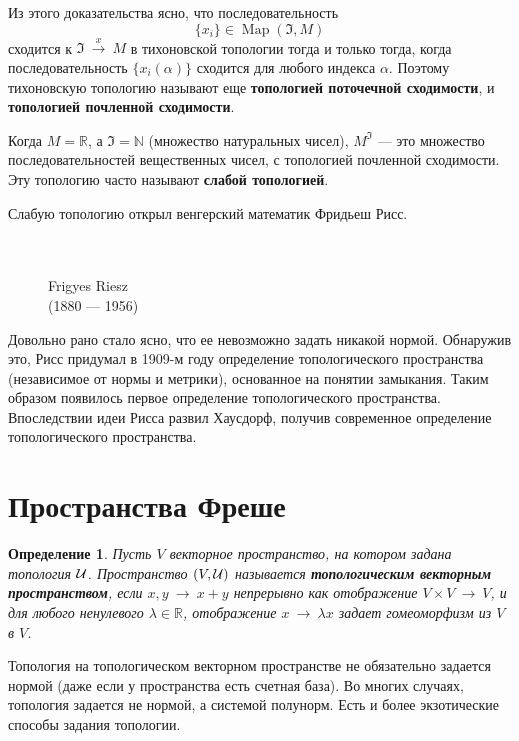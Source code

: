 \documentclass[12pt]{book}
\newcommand{\arrow}{{\:\longrightarrow\:}}
\def\Map{\operatorname{Map}}
\def\R{{\mathbb R}}
\def\N{{\mathbb N}}
\theoremstyle{upshape}
\theoremstyle{generic}
\newtheorem{opredelenie}[teorema]{Определение}
\def\еза{\end{remark}}
\theoremstyle{upshapenonumber}
\newcommand{\следствие}{%
     \refstepcounter{teorema}
     {\noindent\bf Следствие \thechapter.\arabic{teorema}:\ }}
\newcommand{\пример}{%
     \refstepcounter{teorema}
     {\noindent\bf Пример \thechapter.\arabic{teorema}:\ }}
\newcommand{\лемма}{%
     \refstepcounter{teorema}
     {\noindent\bf Лемма \thechapter.\arabic{teorema}:\ }}
\newcommand{\теорема}{%
     \refstepcounter{teorema}
     {\noindent\bf Теорема \thechapter.\arabic{teorema}:\ }}
\newcommand{\утверждение}{%
     \refstepcounter{teorema}
     {\noindent\bf Утверждение \thechapter.\arabic{teorema}:\ }}
\def\бф{\bf}
\def\ем{\em}
\def\ез{\end{zadacha}}
\def\еу{\end{ukazanie}}
\def\определение{\begin{opredelenie}}
\def\ео{\end{opredelenie}}
\def\goth{\mathfrak}
\def\енум{\begin{enumerate}}
\def\ее{\end{enumerate}}
\begin{document}
\hfill

Из этого доказательства ясно,
что последовательность \[ \{x_i\}\in \Map({\goth I}, M)\]
сходится к ${\goth I}\stackrel{x}\arrow M$ в 
тихоновской топологии тогда и только тогда, когда последовательность
$\{x_i(\alpha)\}$ сходится для любого индекса $\alpha$.
Поэтому тихоновскую топологию называют еще
{\бф топологией поточечной сходимости},
и {\бф топологией почленной сходимости}.

Когда $M=\R$, а ${\goth I}=\N$ (множество натуральных чисел), 
$M^{\goth I}$ --- это множество последовательностей
вещественных чисел, с топологией почленной сходимости.
Эту топологию часто называют {\бф слабой топологией}.

Слабую топологию открыл венгерский математик Фридьеш Рисс.

\begin{figure}[ht]
\begin{center}\ \\
\\
{Frigyes Riesz\\
(1880 --- 1956)}
\end{center}
\end{figure}

Довольно рано стало ясно, что ее невозможно задать 
никакой нормой. Обнаружив это, Рисс придумал
в 1909-м году определение топологического пространства
(независимое от нормы и метрики), основанное
на понятии замыкания. Таким образом появилось
первое определение топологического пространства.
Впоследствии идеи Рисса развил Хаусдорф, получив
современное определение топологического пространства.



\section{Пространства Фреше}


\определение
Пусть $V$ векторное пространство, на котором задана
топология ${\cal U}$. Пространство $(V,  {\cal U})$
называется {\бф топологическим векторным пространством},
если  $x,y \arrow x+y$ непрерывно как отображение
$V \times V \arrow V$, и для любого ненулевого $\lambda\in \R$,
отображение $x \arrow \lambda x$ задает гомеоморфизм
из $V$ в $V$.
\ео

Топология на топологическом векторном пространстве
не обязательно задается нормой (даже если у пространства
есть счетная база). Во многих случаях, топология задается 
не нормой, а системой полунорм. Есть и более экзотические 
способы задания топологии.
\end{document}
